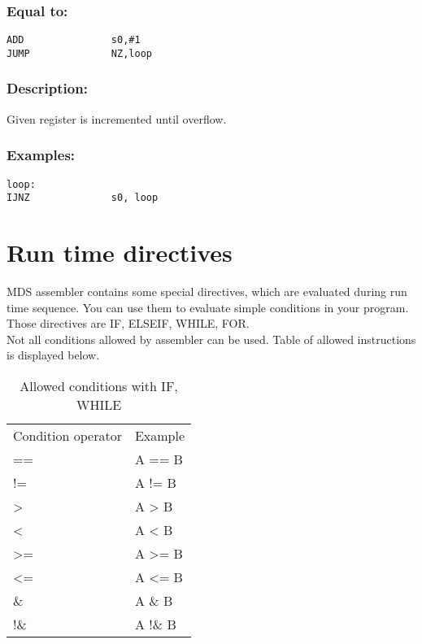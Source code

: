         \subsubsection{Equal to:}
            {
                \usecodefont
                \verb'ADD               s0,#1'\\
                \verb'JUMP              NZ,loop'\\
            }

        \subsubsection{Description:}
            Given register is incremented until overflow.

        \subsubsection{Examples:}
            {
                \usecodefont
                \verb'loop:             '\\
                \verb'IJNZ              s0, loop'\\
            }

\section{Run time directives}
    MDS assembler contains some special directives, which are evaluated during run time sequence. You can use them to evaluate simple conditions in your program. Those directives are IF, ELSEIF, WHILE, FOR.\\ Not all conditions allowed by assembler can be used. Table of allowed instructions is displayed below.

    \begin{table}[h!]
        \mysmallfont{}
        \centering{}
        \begin{tabular}{|l|l}
        \hline
        Condition operator       &          Example  \\
        ==                       &          A ==  B  \\
        !=                       &          A !=  B  \\
        >                        &          A >   B  \\
        <                        &          A <   B  \\
        >=                       &          A >=  B  \\
        <=                       &          A <=  B  \\
        \&                       &          A \&  B  \\
        !\&                      &          A !\& B
        \end{tabular}
        \caption{Allowed conditions with IF, WHILE}
    \end{table}


